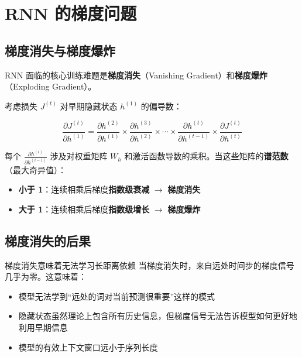 \documentclass[a4paper]{article}
\begin{document}
\section{RNN 的梯度问题}

\subsection{梯度消失与梯度爆炸}

RNN 面临的核心训练难题是\textbf{梯度消失}（Vanishing Gradient）和\textbf{梯度爆炸}（Exploding Gradient）。





考虑损失 $J^{(t)}$ 对早期隐藏状态 $h^{(1)}$ 的偏导数：

$$\frac{\partial J^{(t)}}{\partial h^{(1)}} = \frac{\partial h^{(2)}}{\partial h^{(1)}} \times \frac{\partial h^{(3)}}{\partial h^{(2)}} \times \cdots \times \frac{\partial h^{(t)}}{\partial h^{(t-1)}} \times \frac{\partial J^{(t)}}{\partial h^{(t)}}$$

每个 $\frac{\partial h^{(i)}}{\partial h^{(i-1)}}$ 涉及对权重矩阵 $W_h$ 和激活函数导数的乘积。当这些矩阵的\textbf{谱范数}（最大奇异值）：

\begin{itemize}
    \item \textbf{小于 1}：连续相乘后梯度\textbf{指数级衰减} $\rightarrow$ \textbf{梯度消失}
    \item \textbf{大于 1}：连续相乘后梯度\textbf{指数级增长} $\rightarrow$ \textbf{梯度爆炸}
\end{itemize}





\subsection{梯度消失的后果}

\begin{warningbox}{梯度消失意味着无法学习长距离依赖}
当梯度消失时，来自远处时间步的梯度信号几乎为零。这意味着：
\begin{itemize}
    \item 模型无法学到``远处的词对当前预测很重要''这样的模式
    \item 隐藏状态虽然理论上包含所有历史信息，但梯度信号无法告诉模型如何更好地利用早期信息
    \item 模型的有效上下文窗口远小于序列长度
\end{itemize}
\end{warningbox}
\end{document}
